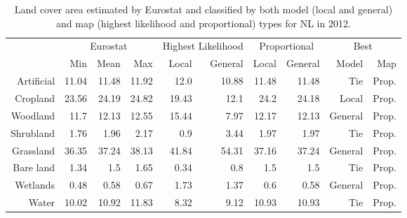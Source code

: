 \begin{table}[H]
\centering
\caption{Land cover area estimated by Eurostat and classified by both model (local and general) and map (highest likelihood and proportional) types for NL in 2012.}

\begin{tabular}{r|rrr|rr|rr|rr}
\toprule
{} & \multicolumn{3}{|c}{Eurostat} & \multicolumn{2}{|c}{Highest Likelihood} & \multicolumn{2}{|c}{Proportional} & \multicolumn{2}{|c}{Best} \\
{} &      Min &   Mean &    Max &              Local & General &        Local & General &    Model &    Map \\
\midrule
Artificial &    11.04 &  11.48 &  11.92 &               12.0 &   10.88 &        11.48 &   11.48 &      Tie &  Prop. \\
Cropland   &    23.56 &  24.19 &  24.82 &              19.43 &    12.1 &         24.2 &   24.18 &    Local &  Prop. \\
Woodland   &     11.7 &  12.13 &  12.55 &              15.44 &    7.97 &        12.17 &   12.13 &  General &  Prop. \\
Shrubland  &     1.76 &   1.96 &   2.17 &                0.9 &    3.44 &         1.97 &    1.97 &      Tie &  Prop. \\
Grassland  &    36.35 &  37.24 &  38.13 &              41.84 &   54.31 &        37.16 &   37.24 &  General &  Prop. \\
Bare land  &     1.34 &    1.5 &   1.65 &               0.34 &     0.8 &          1.5 &     1.5 &      Tie &  Prop. \\
Wetlands   &     0.48 &   0.58 &   0.67 &               1.73 &    1.37 &          0.6 &    0.58 &  General &  Prop. \\
Water      &    10.02 &  10.92 &  11.83 &               8.32 &    9.12 &        10.93 &   10.93 &      Tie &  Prop. \\
\bottomrule
\end{tabular}
\end{table}

